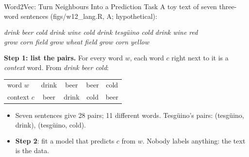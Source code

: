 \documentclass[aspectratio=169,11pt,xcolor=dvipsnames]{beamer}
\newcommand{\srcp}[1]{{\scriptsize\color{gray}(#1)}}
\begin{document}
\begin{frame}{Word2Vec: Turn Neighbours Into a Prediction Task}
A toy text of seven three-word sentences \srcp{figs/w12\_lang.R, A; hypothetical}:
\begin{center}\small
\emph{drink beer cold} \quad \emph{drink wine cold} \quad \emph{drink tesg\"uino cold} \quad \emph{drink wine red}\\
\emph{grow corn field} \quad \emph{grow wheat field} \quad \emph{grow corn yellow}
\end{center}
\textbf{Step 1: list the pairs.} For every word $w$, each word $c$ right next to it is a
\emph{context} word. From \emph{drink beer cold}:
\begin{center}\small
\begin{tabular}{@{}lcccc@{}}
\toprule
word $w$ & drink & beer & beer & cold \\
context $c$ & beer & drink & cold & beer \\
\bottomrule
\end{tabular}
\end{center}
\begin{itemize}\itemsep2pt
  \item Seven sentences give 28 pairs; 11 different words. Tesg\"uino's pairs: (tesg\"uino, drink), (tesg\"uino, cold).
  \item \textbf{Step 2}: fit a model that predicts $c$ from $w$. Nobody labels anything: the text is the data.
\end{itemize}
\end{frame}
\end{document}
